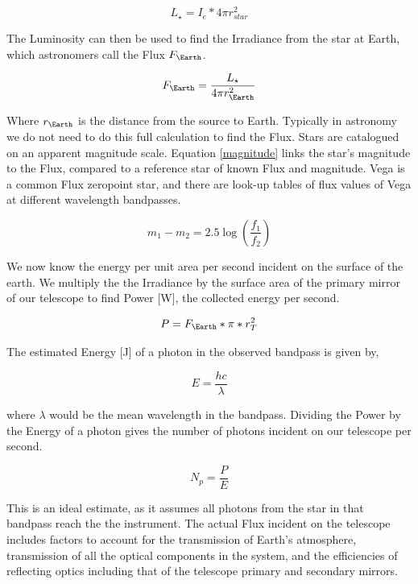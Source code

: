 \begin{equation}
    L_{\star}=I_e*4\pi r_{star}^2
\end{equation}

The Luminosity can then be used to find the Irradiance from the star at Earth, which astronomers call the Flux $F_{\Earth}$.

\begin{equation}
    F_{\Earth}=\frac{L_{\star}}{4\pi r_{\Earth}^2}
\end{equation}

Where $r_{\Earth}$ is the distance from the source to Earth. Typically in astronomy we do not need to do this full calculation to find the Flux. Stars are catalogued on an apparent magnitude scale. Equation \ref{magnitude} links the star's magnitude to the Flux, compared to a reference star of known Flux and magnitude. Vega is a common Flux zeropoint star, and there are look-up tables of flux values of Vega at different wavelength bandpasses. 

\begin{equation}
    m_1-m_2=
    2.5 \log\left(
        \frac{f_1}{f_2}
    \right)
    \label{magnitude}
\end{equation}


We now know the energy per unit area per second incident on the surface of the earth. We multiply the the Irradiance by the surface area of the primary mirror of our telescope to find Power [W], the collected energy per second.

\begin{equation}
    P=F_{\Earth}*\pi*r_T^2
\end{equation}

The estimated Energy [J] of a photon in the observed bandpass is given by,

\begin{equation}
    E=\frac{hc}{\lambda}
\end{equation}

where $\lambda$ would be the mean wavelength in the bandpass. Dividing the Power by the Energy of a photon gives the number of photons incident on our telescope per second.

\begin{equation}
    N_p=\frac{P}{E}
\end{equation}

This is an ideal estimate, as it assumes all photons from the star in that bandpass reach the the instrument. The actual Flux incident on the telescope includes factors to account for the transmission of Earth's atmosphere, transmission of all the optical components in the system, and the efficiencies of reflecting optics including that of the telescope primary and secondary mirrors. 

